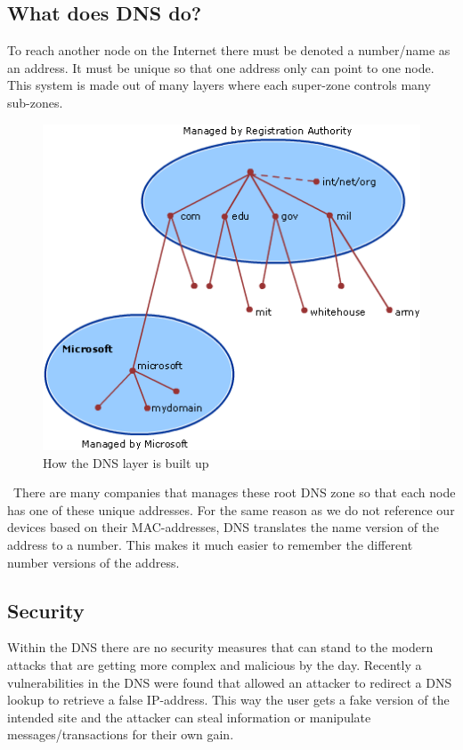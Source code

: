 \documentclass{article}
\begin{document}
		\subsection{What does DNS do?}
		To reach another node on the Internet there must be denoted a number/name as an address. It must be unique so that one address only can point to one node.
        This system is made out of many layers where each super-zone controls many sub-zones. \\
        
        \begin{figure}[htbp]
            \centering
            \includegraphics[scale=0.9]{dnsStruct}
            \caption{How the DNS layer is built up}
        \end{figure}
        \
		There are many companies that manages these root DNS zone so that each node has one of these unique addresses. For the same reason as we do not reference our devices based on their MAC-addresses, DNS translates the name version of the address to a number. This makes it much easier to remember the different number versions of the address.
		\subsection{Security}
		Within the DNS there are no security measures that can stand to the modern attacks that are getting more complex and malicious by the day. Recently a vulnerabilities in the DNS were found that allowed an attacker to redirect a DNS lookup to retrieve a false IP-address. This way the user gets a fake version of the intended site and the attacker can steal information or manipulate messages/transactions for their own gain.
\end{document}
